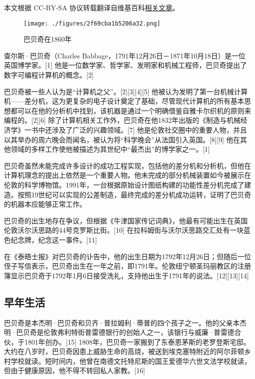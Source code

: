 
本文根据 CC-BY-SA 协议转载翻译自维基百科\href{https://en.wikipedia.org/wiki/Charles_Babbage}{相关文章}。

\begin{figure}[ht]
\centering
\texttt{[image: ./figures/2f69cba1b5206a32.png]}
\caption{巴贝奇在1860年} \label{fig_CRSBQ_1}
\end{figure}
查尔斯·巴贝奇（Charles Babbage，1791年12月26日－1871年10月18日）是一位英国博学家。[1] 他是一位数学家、哲学家、发明家和机械工程师，巴贝奇提出了数字可编程计算机的概念。[2]

巴贝奇被一些人认为是“计算机之父”。[2][3][4][5] 他被认为发明了第一台机械计算机——差分机，这为更复杂的电子设计奠定了基础，尽管现代计算机的所有基本思想都可以在他的分析机中找到，该机器是通过一个明确借鉴自雅卡尔织机的原则来编程的。[2][6] 除了计算机相关工作外，巴贝奇在他1832年出版的《制造与机械经济学》一书中还涉及了广泛的兴趣领域。[7] 他是伦敦社交圈中的重要人物，并且以其举办的周六晚会而闻名，被认为将“科学晚会”从法国引入英国。[8][9] 他在其他领域的多样工作使他被描述为其世纪中“最杰出”的博学家之一。[1]

巴贝奇虽然未能完成许多设计的成功工程实现，包括他的差分机和分析机，但他在计算机理念的提出上依然是一个重要人物。他未完成的部分机械装置如今被展示在伦敦的科学博物馆。1991年，一台根据原始设计图纸构建的功能性差分机完成了建造。按照19世纪可以实现的公差制造，最终完成的差分机成功运转，证明了巴贝奇的机器本应能够正常工作。


巴贝奇的出生地存在争议，但根据《牛津国家传记词典》，他最有可能出生在英国伦敦沃尔沃思路的44号克罗斯比街。[10] 在拉科姆街与沃尔沃思路交汇处有一块蓝色纪念牌，纪念这一事件。[11]

在《泰晤士报》对巴贝奇的讣告中，他的出生日期为1792年12月26日；但随后一位侄子写信表示，巴贝奇出生在一年之前，即1791年。伦敦纽宁顿圣玛丽教区的注册簿显示巴贝奇于1792年1月6日接受洗礼，支持他出生于1791年的说法。[12][13][14]
\subsection{早年生活}
巴贝奇是本杰明·巴贝奇和贝齐·普拉姆利·蒂普的四个孩子之一。他的父亲本杰明·巴贝奇是伦敦弗利特街普雷德银行的创始人之一，该银行与威廉·普雷德合伙，于1801年创办。[15] 1808年，巴贝奇一家搬到了东泰恩茅斯的老罗登斯宅邸。大约在八岁时，巴贝奇因患上威胁生命的高烧，被送到埃克塞特附近的阿尔菲顿乡村学校就读。短时间内，他曾在南德文托特尼斯的国王爱德华六世文法学校就读，但由于健康原因，他不得不转回私人家教。[16]

